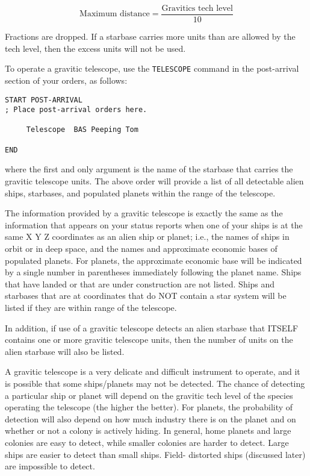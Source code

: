 \documentclass[10pt,titlepage]{article}
\begin{document}
\[
	\textrm{Maximum distance}  =  \dfrac{\textrm{Gravitics tech level}}{10}
\]


Fractions are dropped.  If a starbase carries more units than are allowed by
the tech level, then the excess units will not be used.

To operate a gravitic telescope, use the \texttt{TELESCOPE} command in the post-arrival
section of your orders, as follows:

\begin{verbatim}
START POST-ARRIVAL
; Place post-arrival orders here.

     Telescope	BAS Peeping Tom

END\end{verbatim} 

where the first and only argument is the name of the starbase that carries
the gravitic telescope units.  The above order will provide a list of all
detectable alien ships, starbases, and populated planets within the range
of the telescope.

The information provided by a gravitic telescope is exactly the same as the
information that appears on your status reports when one of your ships is at
the same X Y Z coordinates as an alien ship or planet;  i.e., the names of
ships in orbit or in deep space, and the names and approximate economic bases
of populated planets.  For planets, the approximate economic base will be
indicated by a single number in parentheses immediately following the planet
name.  Ships that have landed or that are under construction are not listed.
Ships and starbases that are at coordinates that do NOT contain a star system
will be listed if they are within range of the telescope.

In addition, if use of a gravitic telescope detects an alien starbase that
ITSELF contains one or more gravitic telescope units, then the number of units
on the alien starbase will also be listed.

A gravitic telescope is a very delicate and difficult instrument to operate,
and it is possible that some ships/planets may not be detected.  The chance of
detecting a particular ship or planet will depend on the gravitic tech level of
the species operating the telescope (the higher the better).  For planets, the
probability of detection will also depend on how much industry there is on the
planet and on whether or not a colony is actively hiding.  In general, home
planets and large colonies are easy to detect, while smaller colonies are
harder to detect.  Large ships are easier to detect than small ships.  Field-
distorted ships (discussed later) are impossible to detect.
\end{document}
